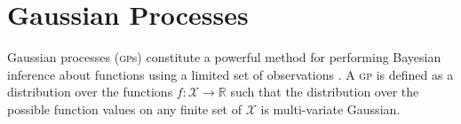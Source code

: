 \documentclass{article}
\newcommand\jansays[1]{\textcolor{blue}{Jan says: #1}}
\renewcommand{\sc}[1]{{\scshape #1}}
\begin{document}


\section{Gaussian Processes}

Gaussian processes (\sc{gp}s) constitute a powerful method for performing Bayesian inference about functions using a limited set of observations \cite{rassandwill}. A \sc{gp} is defined as a distribution over the functions $f : \mathcal{X} \rightarrow \mathbb{R}$ such that the distribution over the possible function values on any finite set of $\mathcal{X}$ is multi-variate Gaussian.
\end{document}
